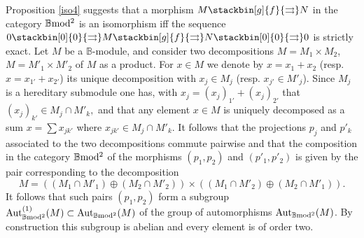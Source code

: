 \documentclass[12pt]{article}
\def\Aut{{\rm Aut}}
\def\B{{\mathbb B}}
\def\strgly{strictly }
\def\bm2{{\rm \B mod^2}}
\begin{document}
\endproof
Proposition \ref{iso4} suggests that a morphism $M\stackbin[g]{f}{\rightrightarrows}N$ in the category $\bm2$ is an isomorphism iff the sequence $0 \stackbin[0]{0}{\rightrightarrows}M\stackbin[g]{f}{\rightrightarrows}N\stackbin[0]{0}{\rightrightarrows}0$ is  \strgly exact. 
 Let $M$ be a $\B$-module, and consider two decompositions $M=M_1\times M_2$, $M=M'_1\times M'_2$  of $M$ as a product. For $x\in M$ we denote by $x=x_1+x_2$ (resp. $x=x_{1'}+x_{2'}$) its unique decomposition with $x_j\in M_j$ (resp. $x_{j'}\in M'_j$). Since $M_j$ is a hereditary submodule one has, with $x_j=(x_j)_{1'}+(x_j)_{2'}$ that 
 $
 (x_j)_{k'}\in M_j\cap M'_k,$ and that any element $x\in M$ is uniquely decomposed as a sum $x=\sum x_{jk'}$ where $x_{jk'}\in  M_j\cap M'_k$. It follows that the projections $p_j$ and $p'_k$ associated to the two decompositions commute pairwise and that the composition in the category $\bm2$ of the morphisms $(p_1,p_2)$ and $(p'_1,p'_2)$ is given by the pair corresponding to the decomposition 
 $$
 M=\left((M_1\cap M'_1)\oplus (M_2\cap M'_2)\right)\times 
 \left((M_1\cap M'_2)\oplus (M_2\cap M'_1)\right).
 $$
 It follows that such pairs $(p_1,p_2)$ form a subgroup $\Aut^{(1)}_\bm2(M)\subset \Aut_\bm2(M)$ of the group of automorphisms $\Aut_\bm2(M)$. By construction this subgroup is abelian and every element is of order two.
 
\end{document}
